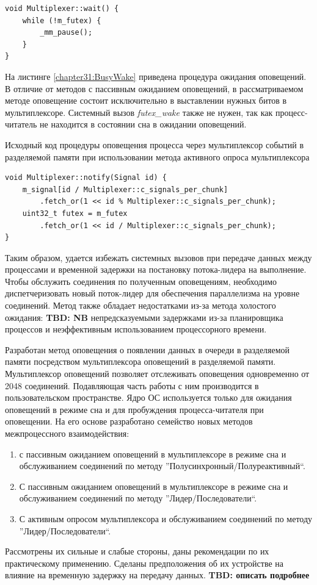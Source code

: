 \begin{lstlisting}[float=!h,caption={Исходный код процедуры ожидания оповещений через мультиплексор событий в разделяемой памяти при использовании метода активного опроса мультиплексора},label={chapter31:BusyWait},frame=tlrb]
void Multiplexer::wait() {
	while (!m_futex) {
		_mm_pause();
	}
}
\end{lstlisting}

На листинге \ref{chapter31:BusyWake} приведена процедура ожидания оповещений. В отличие от методов с пассивным ожиданием оповещений, в рассматриваемом методе оповещение состоит исключительно в выставлении нужных битов в мультиплексоре. Системный вызов \textit{futex\_wake} также не нужен, так как процесс-читатель не находится в состоянии сна в ожидании оповещений.

\begin{algorithm}[!h]
\caption{Исходный код процедуры оповещения процесса через мультиплексор событий в разделяемой памяти при использовании метода активного опроса мультиплексора}
\label{chapter31:BusyWake}
\begin{lstlisting}[frame=tlrb]
void Multiplexer::notify(Signal id) {
	m_signal[id / Multiplexer::c_signals_per_chunk]
		.fetch_or(1 << id % Multiplexer::c_signals_per_chunk);
	uint32_t futex = m_futex
		.fetch_or(1 << id / Multiplexer::c_signals_per_chunk);
}
\end{lstlisting}
\end{algorithm}

Таким образом, удается избежать системных вызовов при передаче данных между процессами и временной задержки на постановку потока-лидера на выполнение. Чтобы обслужить соединения по полученным оповещениям, необходимо диспетчеризовать новый поток-лидер для обеспечения параллелизма на уровне соединений. Метод также обладает недостатками из-за метода холостого ожидания: \textbf{TBD: NB} непредсказуемыми задержками из-за планировщика процессов и неэффективным использованием процессорного времени.

\chapterconclusion

Разработан метод оповещения о появлении данных в очереди в разделяемой памяти посредством мультиплексора оповещений в разделяемой памяти. Мультиплексор оповещений позволяет отслеживать оповещения одновременно от 2048 соединений. Подавляющая часть работы с ним производится в пользовательском пространстве. Ядро ОС используется только для ожидания оповещений в режиме сна и для пробуждения процесса-читателя при оповещении. 
На его основе разработано семейство новых методов межпроцессного взаимодействия:
\begin{enumerate}
\item с пассивным ожиданием оповещений в мультиплексоре в режиме сна и обслуживанием соединений по методу ''Полусинхронный/Полуреактивный``.
\item С пассивным ожиданием оповещений в мультиплексоре в режиме сна и обслуживанием соединений по методу ''Лидер/Последователи``.
\item С активным опросом мультиплексора и обслуживанием соединений по методу ''Лидер/Последователи``.
\end{enumerate}

Рассмотрены их сильные и слабые стороны, даны рекомендации по их практическому применению. Сделаны предположения об их устройстве на влияние на временную задержку на передачу данных. \textbf{TBD: описать подробнее}
